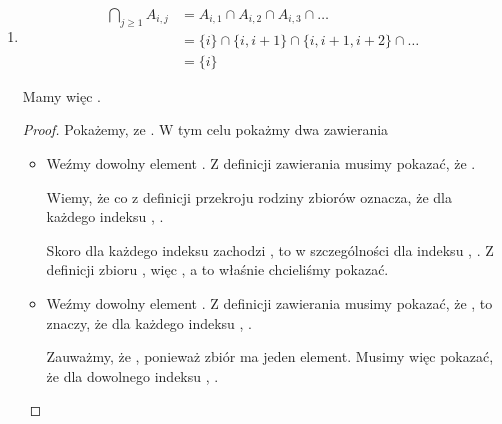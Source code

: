 \begin{example}
\begin{enumerate}
\begin{proof}
\begin{itemize}
        Weźmy więc dowolny indeks .  jest zbiorem  kolejnych elementów, począwszy od . To znaczy, . Skoro , to , a to chcieliśmy pokazać.
    \end{itemize}
    \end{proof}
    
    \item {}
    
    \[
        \begin{split}
            \bigcap\limits_{j \geq 1} A_{i,j}
            &= A_{i,1} \cap A_{i,2} \cap A_{i,3} \cap \dots
            \\&= \{ i \} \cap \{ i, i+1 \} \cap \{ i,i+1,i+2 \} \cap \dots
            \\&= \{ i \}
        \end{split}
    \]
    
    Mamy więc . 
    \begin{proof}
    Pokażemy, ze  . W tym celu pokażmy dwa zawierania
    \begin{itemize}
        \item {}
        
        Weźmy dowolny element . Z definicji zawierania musimy pokazać, że . 
        
        Wiemy, że  co z definicji przekroju rodziny zbiorów oznacza, że dla każdego indeksu , . 
        
        Skoro dla każdego indeksu  zachodzi , to w szczególności dla indeksu , . Z definicji zbioru , więc , a to właśnie chcieliśmy pokazać.
        
        \item {}
        
        Weźmy dowolny element . Z definicji zawierania musimy pokazać, że , to znaczy, że dla każdego indeksu , .
        
        Zauważmy, że , ponieważ zbiór  ma jeden element. Musimy więc pokazać, że dla dowolnego indeksu , . 
        

\end{itemize}
\end{proof}
\end{enumerate}
\end{example}
